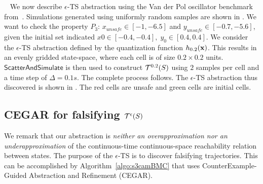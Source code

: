 \begin{example}~\label{ex:vdp}
We now describe $\epsilon$-TS abstraction using the Van der Pol
    oscillator benchmark from~\cite{zutshi2014multiple}. Simulations
    generated using uniformly random samples are shown in
    . We want to check the property $P_3$:
    $x_{unsafe}\in[-1,-6.5]$ and $y_{unsafe}\in[-0.7, -5.6]$, given
    the initial set indicated $x0\in[-0.4, -0.4],\; y_0\in[0.4, 0.4]$.
    We consider the $\epsilon$-TS abstraction defined by the
    quantization function $h_{0.2}(\mathbf{x})$. This results in an
    evenly gridded state-space, where each cell is of size $0.2 \times
    0.2$ units.  $\mathsf{ScatterAndSimulate}$ is then used to
    construct $\mathcal{T}^{0.2}(S)$ using $2$ samples per
    cell and a time step of $\Delta = 0.1s$. The complete process
    follows.  The $\epsilon$-TS abstraction thus discovered is shown
    in . The red cells are unsafe and green cells are
    initial cells.
\end{example}


\subsection{CEGAR for falsifying $\mathcal{T}^{\epsilon}(S)$}

We remark that our abstraction is {\em neither an overapproximation
nor an underapproximation} of the continuous-time continuous-space
reachability relation between states. The purpose of the $\epsilon$-TS
is to discover falsifying trajectories. This can be accomplished by
Algorithm~\ref{algo:s3camBMC} that uses CounterExample-Guided
Abstraction and Refinement (CEGAR).

